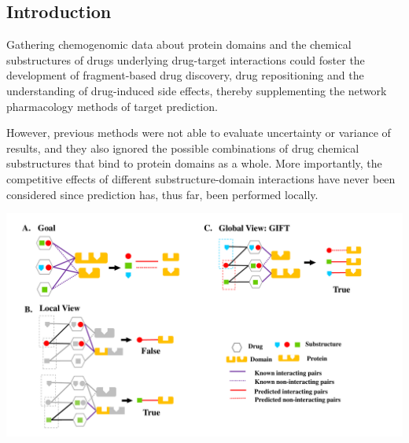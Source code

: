 \documentclass[a0,portrait]{a0poster}
\begin{document}
\begin{multicols}{2}

\color{SaddleBrown} %

\section*{Introduction}
Gathering chemogenomic data about protein domains and the chemical substructures of drugs underlying drug-target interactions could foster the development of fragment-based drug discovery, drug repositioning and the understanding of drug-induced side effects, thereby supplementing the network pharmacology methods of target prediction.

However, previous methods were not able to evaluate uncertainty or variance of results, and they also ignored the possible combinations of drug chemical substructures that bind to protein domains as a whole. More importantly, the competitive effects of different substructure-domain interactions have never been considered since prediction has, thus far, been performed locally.

\begin{center}\vspace{1cm}
  \includegraphics[width=\linewidth]{explains_v2}
\end{center}\vspace{1cm}



\end{multicols}
\end{document}
